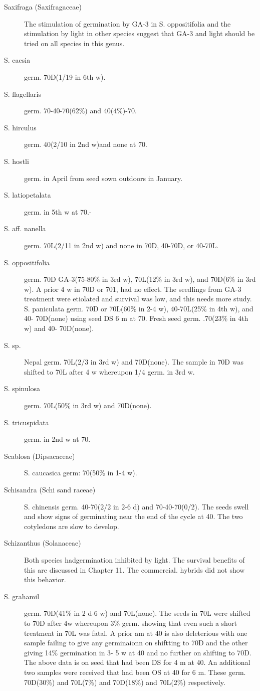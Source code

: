 \begin{description}
\item[Saxifraga (Saxifragaceae)] The stimulation of germination by GA-3 in S.
oppositifolia and the stimulation by light in other species suggest that GA-3 and light
should be tried on all species in this genus.
\item[S. caesia] germ. 70D(1/19 in 6th w).
\item[S. flagellaris] germ. 70-40-70(62\%) and 40(4\%)-70.
\item[S. hirculus] germ. 40(2/10 in 2nd w)and none at 70.
\item[S. hostli] germ. in April from seed sown outdoors in January.
\item[S. latiopetalata] germ. in 5th w at 70.-
\item[S. aff. nanella] germ. 70L(2/11 in 2nd w) and none in 70D, 40-70D, or 40-70L.
\item[S. oppositifolia] germ. 70D GA-3(75-80\% in 3rd w), 70L(12\% in 3rd w), and
70D(6\% in 3rd w). A prior 4 w in 70D or 701, had no effect. The seedlings from GA-3
treatment were etiolated and survival was low, and this needs more study.
S. paniculata germ. 70D or 70L(60\% in 2-4 w), 40-70L(25\% in 4th w), and 40-
70D(none) using seed DS 6 m at 70. Fresh seed germ. .70(23\% in 4th w) and 40-
70D(none).
\item[S. sp.] Nepal germ. 70L(2/3 in 3rd w) and 70D(none). The sample in 70D was
shifted to 70L after 4 w whereupon 1/4 germ. in 3rd w.
\item[S. spinulosa] germ. 70L(50\% in 3rd w) and 70D(none).
\item[S. tricuspidata] germ. in 2nd w at 70.
\item[Scablosa (Dipsacaceae)] S. caucasica germ: 70(50\% in 1-4 w).
\item[Schisandra (Schi sand raceae)] S. chinensis germ. 40-70(2/2 in 2-6 d) and
70-40-70(0/2). The seeds swell and show signs of germinating near the end of the
cycle at 40. The two cotyledons are slow to develop.

\item[Schizanthus (Solanaceae)] Both species hadgermination inhibited by
light. The survival benefits of this are discussed in Chapter 11. The commercial.
hybrids did not show this behavior.
\item[S. grahamil] germ. 70D(41\% in 2 d-6 w) and 70L(none). The seeds in 70L were
shifted to 70D after 4w whereupon 3\% germ. showing that even such a short
treatment in 70L was fatal. A prior am at 40 is also deleterious with one sample failing
to give any germinaionn on shiftting to 70D and the other giving 14\% germination in 3-
5 w at 40 and no further on shifting to 70D. The above data is on seed that had been
DS for 4 m at 40. An additional two samples were received that had been OS at 40 for
6 m. These germ. 70D(30\%) and 70L(7\%) and 70D(18\%) and 70L(2\%) respectively.


\end{description}

